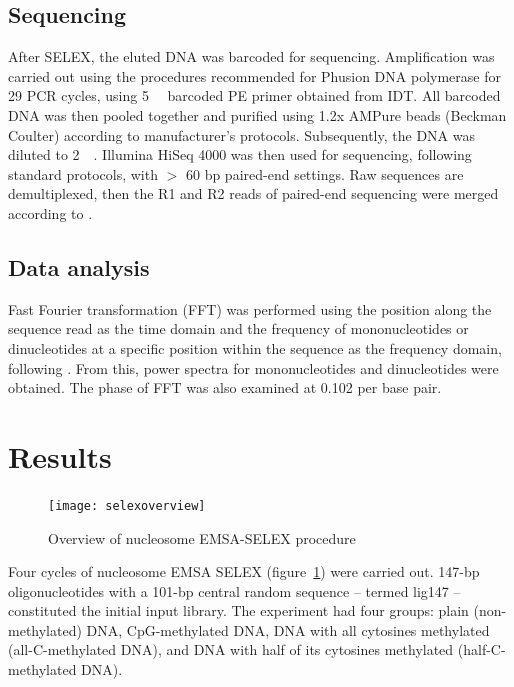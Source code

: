 \documentclass[parskip=full, numbers=noenddot]{scrreprt}
\begin{document}
\subsection{Sequencing}
\label{ssec:emsaselex_methods_seq}

After SELEX, the eluted DNA was barcoded for sequencing.  Amplification was carried out using the procedures recommended for Phusion DNA polymerase for 29 PCR cycles, using \SI{5}{\micro\Molar} barcoded PE primer obtained from IDT.  All barcoded DNA was then pooled together and purified using 1.2x AMPure beads (Beckman Coulter) according to manufacturer's protocols.  Subsequently, the DNA was diluted to \SI{2}{\nano\Molar}.  Illumina HiSeq 4000 was then used for sequencing, following standard protocols, with $>$ 60 bp paired-end settings.  Raw sequences are demultiplexed, then the R1 and R2 reads of paired-end sequencing were merged according to \citet{zhu_interaction_2018}.

\subsection{Data analysis}
\label{ssec:emsaselex_methods_anal}

Fast Fourier transformation (FFT) was performed using the position along the sequence read as the time domain and the frequency of mononucleotides or dinucleotides at a specific position within the sequence as the frequency domain, following \citet{zhu_interaction_2018}.  From this, power spectra for mononucleotides and dinucleotides were obtained.  The phase of FFT was also examined at 0.102 per base pair.

\section{Results}
\label{sec:emsaselex_results}

\begin{figure}[htpb]
  \centering
  \texttt{[image: selexoverview]}
  \caption{Overview of nucleosome EMSA-SELEX procedure}
  \label{fig:selex}
\end{figure}

Four cycles of nucleosome EMSA SELEX (figure~\ref{fig:selex}) were carried out.  147-bp oligonucleotides with a 101-bp central random sequence -- termed lig147 \citep{zhu_interaction_2018} -- constituted the initial input library.  The experiment had four groups: plain (non-methylated) DNA, CpG-methylated DNA, DNA with all cytosines methylated (all-C-methylated DNA), and DNA with half of its cytosines methylated (half-C-methylated DNA).
\end{document}
